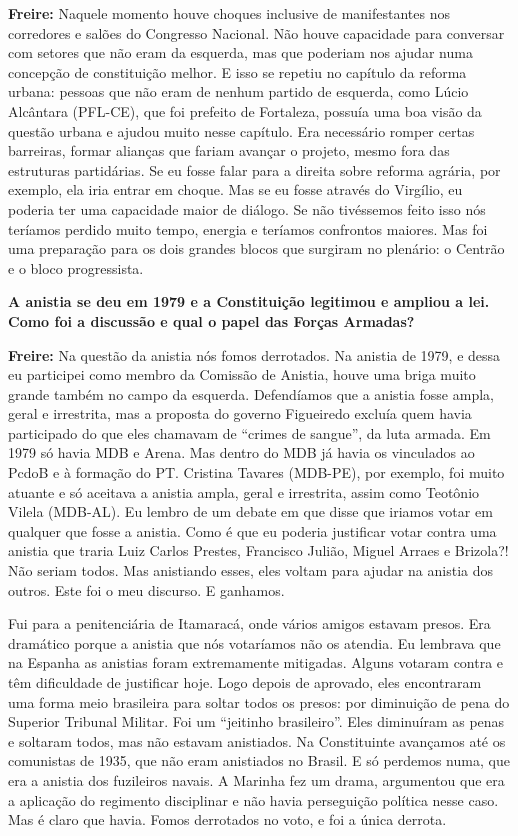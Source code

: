 \textbf{Freire:} Naquele momento houve choques inclusive de
manifestantes nos corredores e salões do Congresso Nacional. Não houve
capacidade para conversar com setores que não eram da esquerda, mas que
poderiam nos ajudar numa concepção de constituição melhor. E isso se
repetiu no capítulo da reforma urbana: pessoas que não eram de nenhum
partido de esquerda, como Lúcio Alcântara (PFL-CE), que foi prefeito de
Fortaleza, possuía uma boa visão da questão urbana e ajudou muito nesse
capítulo. Era necessário romper certas barreiras, formar alianças que
fariam avançar o projeto, mesmo fora das estruturas partidárias. Se eu
fosse falar para a direita sobre reforma agrária, por exemplo, ela iria
entrar em choque. Mas se eu fosse através do Virgílio, eu poderia ter
uma capacidade maior de diálogo. Se não tivéssemos feito isso nós
teríamos perdido muito tempo, energia e teríamos confrontos maiores. Mas
foi uma preparação para os dois grandes blocos que surgiram no plenário:
o Centrão e o bloco progressista.

\textbf{A anistia se deu em 1979 e a Constituição legitimou e ampliou a
lei. Como foi a discussão e qual o papel das Forças Armadas?}

\textbf{Freire:} Na questão da anistia nós fomos derrotados. Na anistia
de 1979, e dessa eu participei como membro da Comissão de Anistia, houve
uma briga muito grande também no campo da esquerda. Defendíamos que a
anistia fosse ampla, geral e irrestrita, mas a proposta do governo
Figueiredo excluía quem havia participado do que eles chamavam de
``crimes de sangue'', da luta armada. Em 1979 só havia MDB e Arena. Mas
dentro do MDB já havia os vinculados ao PcdoB e à formação do PT.
Cristina Tavares (MDB-PE), por exemplo, foi muito atuante e só aceitava
a anistia ampla, geral e irrestrita, assim como Teotônio Vilela
(MDB-AL). Eu lembro de um debate em que disse que iriamos votar em
qualquer que fosse a anistia. Como é que eu poderia justificar votar
contra uma anistia que traria Luiz Carlos Prestes, Francisco Julião,
Miguel Arraes e Brizola?! Não seriam todos. Mas anistiando esses, eles
voltam para ajudar na anistia dos outros. Este foi o meu discurso. E
ganhamos.

Fui para a penitenciária de Itamaracá, onde vários amigos estavam
presos. Era dramático porque a anistia que nós votaríamos não os
atendia. Eu lembrava que na Espanha as anistias foram extremamente
mitigadas. Alguns votaram contra e têm dificuldade de justificar hoje.
Logo depois de aprovado, eles encontraram uma forma meio brasileira para
soltar todos os presos: por diminuição de pena do Superior Tribunal
Militar. Foi um ``jeitinho brasileiro''. Eles diminuíram as penas e
soltaram todos, mas não estavam anistiados. Na Constituinte avançamos
até os comunistas de 1935, que não eram anistiados no Brasil. E só
perdemos numa, que era a anistia dos fuzileiros navais. A Marinha fez um
drama, argumentou que era a aplicação do regimento disciplinar e não
havia perseguição política nesse caso. Mas é claro que havia. Fomos
derrotados no voto, e foi a única derrota.

